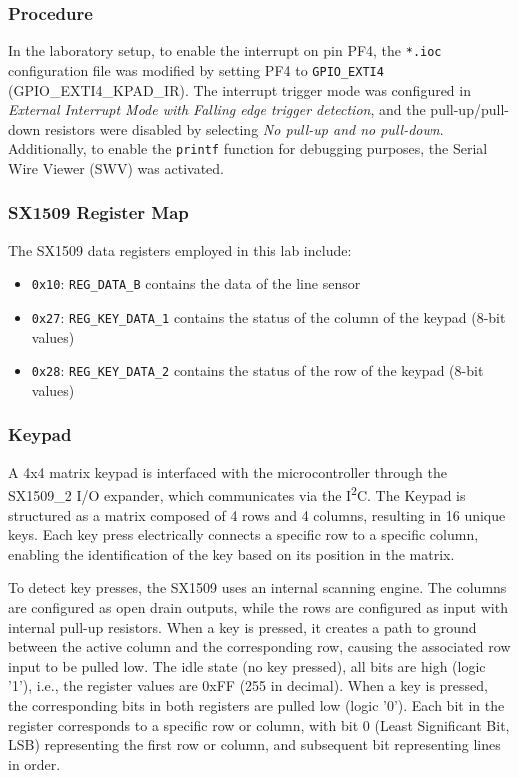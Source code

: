 \subsubsection{Procedure}

In the laboratory setup, to enable the interrupt on pin PF4, the \texttt{*.ioc} configuration file was modified by setting PF4 to \texttt{GPIO\_EXTI4} (GPIO\_EXTI4\_KPAD\_IR). The interrupt trigger mode was configured in \emph{External Interrupt Mode with Falling edge trigger detection}, and the pull-up/pull-down resistors were disabled by selecting \emph{No pull-up and no pull-down}. Additionally, to enable the \texttt{printf} function for debugging purposes, the Serial Wire Viewer (SWV) was activated. 

\subsubsection{SX1509 Register Map}

The SX1509 data registers employed in this lab include: 

\begin{itemize}
    \item \texttt{0x10}: \texttt{REG\_DATA\_B} contains the data of the line sensor
    \item \texttt{0x27}: \texttt{REG\_KEY\_DATA\_1} contains the  status of the column of the keypad (8-bit values)
    \item \texttt{0x28}: \texttt{REG\_KEY\_DATA\_2} contains the  status of the row of the keypad (8-bit values)
\end{itemize}

\subsubsection{Keypad}

A 4x4 matrix keypad is interfaced with the microcontroller through the SX1509\_2 I/O expander, which communicates via the I\textsuperscript{2}C. The Keypad is structured as a matrix composed of 4 rows and 4 columns, resulting in 16 unique keys. Each key press electrically connects a specific row to a specific column, enabling the identification of the key based on its position in the matrix. 

To detect key presses, the SX1509 uses an internal scanning engine. The columns are configured as open drain outputs, while the rows are configured as input with internal pull-up resistors. When a key is pressed, it creates a path to ground between the active column and the corresponding row, causing the associated row input to be pulled low. The idle state (no key pressed), all bits are high (logic '1'), i.e., the register values are 0xFF (255 in decimal). When a  key is pressed, the corresponding bits in both registers are pulled low (logic '0'). Each bit in the register corresponds to a specific row or column, with bit 0 (Least Significant Bit, LSB) representing the first row or column, and subsequent bit representing lines in order. \\


